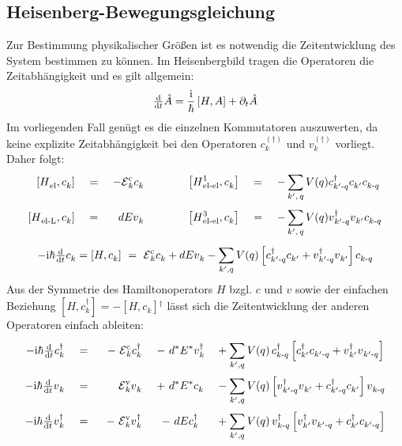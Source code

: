\documentclass[a4paper,11pt]{article}
\newcommand{\ind}[2]{{_{#1}^{#2}}}
\newcommand{\+}{\dagger}
\newcommand{\E}{\mathcal{E}}
\newcommand{\dt}[1]{\tfrac{\tt d #1}{\tt d t}}
\renewcommand{\^}{\hat}
\renewcommand{\tt}{\text}
\renewcommand{\~}{\widetilde}
\begin{document}
\subsection{Heisenberg-Bewegungsgleichung}
Zur Bestimmung physikalischer Größen ist es notwendig die Zeitentwicklung des System bestimmen zu können. Im Heisenbergbild tragen die Operatoren die Zeitabhängigkeit und es gilt allgemein: 
\begin{align*}
\dt{} \^A  = \frac{\tt i}{\hbar}\left [H,A\right ] + \partial_t \^{A}
\end{align*}
Im vorliegenden Fall genügt es die einzelnen Kommutatoren auszuwerten, da keine explizite Zeitabhängigkeit bei den Operatoren $c\ind{k}{(\+)}$ und  $v\ind{k}{(\+)}$ vorliegt. Daher folgt:
\begin{alignat*}{7}
\left [H\ind{\tt{el}}{},c\ind{k}{}\right ]   && \ = \ &&-\E \ind{k}{\tt c} c\ind{k}{} && \qquad &&
 \left [H\ind{\tt{el-el}}{1},c\ind{k}{}\right ]  &&\ =\ && -\sum_{k',\,q} \,&V(q)c\ind{k'\tt -q}{\+}c\ind{k'}{}c\ind{k\tt -q}{} \\
\left [H\ind{\tt{el-L}}{},c\ind{k}{}\right ]  &&\ =\ && dE v\ind{k}{} && \qquad &&
\left [H\ind{\tt{el-el}}{3},c\ind{k}{}\right ]  &&\ =\ && -\sum_{k',\,q}^{}\, &V(q)v\ind{k'\tt-q}{\+}v\ind{k'}{}c\ind{k\tt -q}{}
\end{alignat*} 
\[ 	-\tt i\hbar\dt{} c\ind{k}{}  =  \left [H,c\ind{k}{}\right ] \ = \  \E \ind{k}{\tt c}c\ind{k}{}+dEv\ind{k}{} - \sum_{k',q}^{} V(q)\left [c\ind{k'\tt -q}{\+}c\ind{k'}{}+v\ind{k'\tt-q}{\+}v\ind{k'}{}\right ]c\ind{k\tt -q}{} 		\]
Aus der Symmetrie des Hamiltonoperators $H$ bzgl. $c$ und $v$ sowie der einfachen Beziehung $[H,c\ind{k}{\+}]=-[H,c\ind{k}{}]\ind{}{\+}$ lässt sich die Zeitentwicklung der anderen Operatoren einfach ableiten: 
\begin{alignat*}{5}
-\tt i\hbar\dt{} c\ind{k}{\+}   &&\ =\ && \ - \ \E \ind{k}{\tt c}c\ind{k}{\+} && \ -\  d^*&E^*v\ind{k}{\+} &&+ \sum_{k',q}^{} V(q)\, c\ind{k\tt -q}{\+}\left [c\ind{k'}{\+}c\ind{k'\tt -q}{}+v\ind{k'}{\+}v\ind{k'\tt-q}{}\right ] \\
-\tt i\hbar\dt{} v\ind{k}{}  && \ = \  &&  \E \ind{k}{\tt v}v\ind{k}{}    &&\ +\  d^*&E^* c\ind{k}{}  &&- \sum_{k',q}^{} V(q)\left [v\ind{k'\tt -q}{\+}v\ind{k'}{}+c\ind{k'\tt-q}{\+}c\ind{k'}{}\right ]v\ind{k\tt -q}{} \\ 
-\tt i\hbar\dt{} v\ind{k}{\+}   &&\ =\ && \ -\ \E \ind{k}{\tt v}v\ind{k}{\+} && \ -\ d&Ec\ind{k}{\+} &&+ \sum_{k',q}^{} V(q)\, v\ind{k\tt -q}{\+}\left [v\ind{k'}{\+}v\ind{k'\tt -q}{}+c\ind{k'}{\+}c\ind{k'\tt-q}{}\right ]
\end{alignat*}
\end{document}
